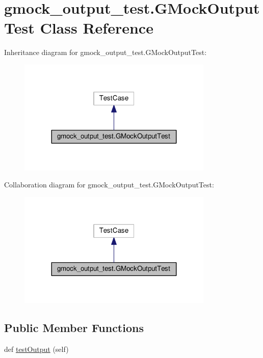 \hypertarget{classgmock__output__test_1_1GMockOutputTest}{}\section{gmock\+\_\+output\+\_\+test.\+G\+Mock\+Output\+Test Class Reference}
\label{classgmock__output__test_1_1GMockOutputTest}


Inheritance diagram for gmock\+\_\+output\+\_\+test.\+G\+Mock\+Output\+Test\+:\nopagebreak
\begin{figure}[H]
\begin{center}
\leavevmode
\includegraphics[width=263pt]{classgmock__output__test_1_1GMockOutputTest__inherit__graph}
\end{center}
\end{figure}


Collaboration diagram for gmock\+\_\+output\+\_\+test.\+G\+Mock\+Output\+Test\+:\nopagebreak
\begin{figure}[H]
\begin{center}
\leavevmode
\includegraphics[width=263pt]{classgmock__output__test_1_1GMockOutputTest__coll__graph}
\end{center}
\end{figure}
\subsection*{Public Member Functions}
\begin{DoxyCompactItemize}
\item 
def \hyperlink{classgmock__output__test_1_1GMockOutputTest_a661e7846690f48328fd9e0834fde9980}{test\+Output} (self)
\end{DoxyCompactItemize}


